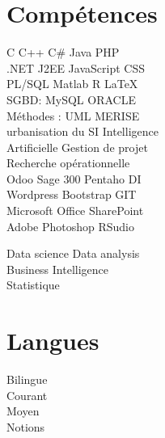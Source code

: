\documentclass[]{arm-resume}
\begin{document}
\begin{minipage}[t]{0.33\textwidth}
\section{Compétences}
C \textbullet{}   C++ \textbullet{}  C\# \textbullet{}  Java \textbullet{}   PHP \\
 .NET \textbullet{}   J2EE  \textbullet{} JavaScript  \textbullet{} CSS  \\
PL/SQL \textbullet{} Matlab \textbullet{} R \textbullet{}  \LaTeX\ \\ 
SGBD: MySQL \textbullet{} ORACLE \\ 
Méthodes : UML \textbullet{} MERISE \\
urbanisation du SI  \textbullet{} Intelligence\\
Artificielle \textbullet{} Gestion de projet  \\
Recherche opérationnelle \\
\sectionsep
{}
Odoo \textbullet{} Sage 300  \textbullet{} Pentaho DI \\
Wordpress \textbullet{} Bootstrap  \textbullet{} GIT \\
Microsoft Office \textbullet{} SharePoint \\
Adobe Photoshop \textbullet{} RSudio

\sectionsep
{}
Data science \textbullet{} Data analysis \\
Business Intelligence \\ Statistique 

\sectionsep


\section{Langues}
 Bilingue\\
 Courant\\
 Moyen\\
 Notions\\

\sectionsep

%
%

\end{minipage} 
\hfill
\end{document}
